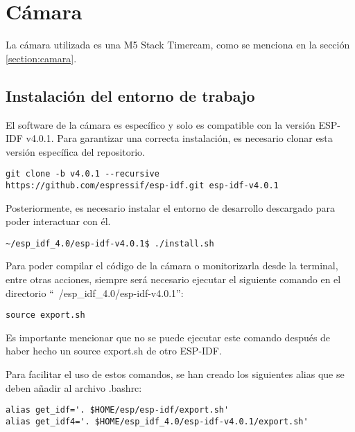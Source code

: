 \section{Cámara}

La cámara utilizada es una M5 Stack Timercam, como se menciona en la sección \ref{section:camara}.

\subsection{Instalación del entorno de trabajo}
\label{section:cameraenvironmentinstallation}

El software de la cámara es específico y solo es compatible con la versión ESP-IDF v4.0.1. Para garantizar una correcta instalación, es necesario clonar esta versión específica del repositorio.

\begin{verbatim}
git clone -b v4.0.1 --recursive 
https://github.com/espressif/esp-idf.git esp-idf-v4.0.1
\end{verbatim}

Posteriormente, es necesario instalar el entorno de desarrollo descargado para poder interactuar con él.

\begin{verbatim}
~/esp_idf_4.0/esp-idf-v4.0.1$ ./install.sh
\end{verbatim}

Para poder compilar el código de la cámara o monitorizarla desde la terminal, entre otras acciones, siempre será necesario ejecutar el siguiente comando en el directorio ``~/esp\_idf\_4.0/esp-idf-v4.0.1'':

\begin{verbatim}
source export.sh
\end{verbatim}

Es importante mencionar que no se puede ejecutar este comando después de haber hecho un source export.sh de otro ESP-IDF.

Para facilitar el uso de estos comandos, se han creado los siguientes alias que se deben añadir al archivo .bashrc:

\begin{verbatim}
alias get_idf='. $HOME/esp/esp-idf/export.sh'
alias get_idf4='. $HOME/esp_idf_4.0/esp-idf-v4.0.1/export.sh'
\end{verbatim}
